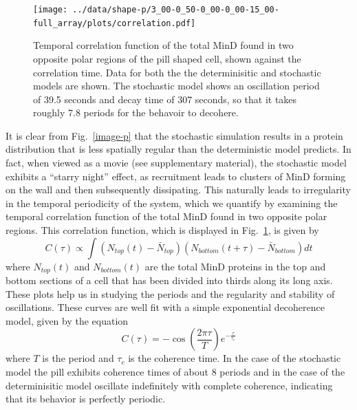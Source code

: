 \documentclass[letterpaper,twocolumn,amsmath,amssymb,pre]{revtex4-1}
\begin{document}
\begin{figure}
  \texttt{[image: ../data/shape-p/3\_00-0\_50-0\_00-0\_00-15\_00-full\_array/plots/correlation.pdf]}
  \caption{Temporal correlation function of the total MinD found in
    two opposite polar regions of the pill shaped cell, shown against
    the correlation time.  Data for both the the determinisitic and
    stochastic models are shown.  The stochastic model shows an
    oscillation period of 39.5 seconds and decay time of 307 seconds,
    so that it takes roughly 7.8 periods for the behavoir to
    decohere.}
  \label{corr-pill}
\end{figure}

It is clear from Fig.~\ref{image-p} that the stochastic simulation
results in a protein distribution that is less spatially regular than
the deterministic model predicts.  In fact, when viewed as a movie
(see supplementary material), the stochastic model exhibits a ``starry
night'' effect, as recruitment leads to clusters of MinD forming on
the wall and then subsequently dissipating.  This naturally leads to
irregularity in the temporal periodicity of the system, which we
quantify by examining the temporal correlation function of the total
MinD found in two opposite polar regions.
%
This correlation function, which is displayed in Fig.~\ref{corr-pill},
is given by
\begin{equation}
  C(\tau) \propto \int
  (N_{\textit{top}}(t) - \bar N_{\textit{top}})
  (N_{\textit{bottom}}(t+\tau) - \bar N_{\textit{bottom}})dt
\end{equation}
where $N_{\textit{top}}(t)$ and $N_{\textit{bottom}}(t)$ are the total
MinD proteins in the top and bottom sections of a cell that has been
divided into thirds along its long axis.  These plots help us in
studying the periods and the regularity and stability of oscillations.
These curves are well fit with a simple exponential decoherence model,
given by the equation
\begin{equation}
  C(\tau) = -\cos\left(\frac{2\pi\tau}{T}\right) e^{-\frac{\tau}{\tau_c}}
\end{equation}
where $T$ is the period and $\tau_c$ is the coherence time.  In the
case of the stochastic model the pill exhibits coherence times of
about 8 periods and in the case of the determinisitic model oscillate
indefinitely with complete coherence, indicating that its behavior is
perfectly periodic.
\end{document}
